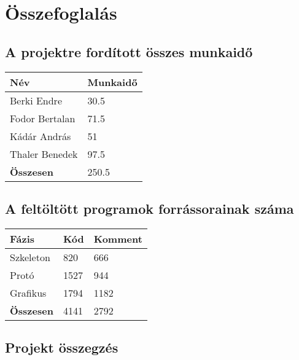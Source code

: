 

\usepackage{enumitem}
\usepackage{textcomp}
\usepackage[utf8]{inputenc}
\usepackage[T1]{fontenc}



\fedlap

\addtocounter{section}{13}
\section{Összefoglalás}

	\subsection{A projektre fordított összes munkaidő}
		\begin{center}
		    \begin{tabular}{ | l | l |}
			    \hline
			    \textbf{Név}		& \textbf{Munkaidő}	\\ \hline
				Berki Endre			& 30.5				\\ \hline
			    Fodor Bertalan		& 71.5				\\ \hline
			    Kádár András		& 51				\\ \hline
			    Thaler Benedek		& 97.5				\\ \hline
			    \hline
			    \textbf{Összesen}	& 250.5				\\ \hline
		    \end{tabular}
		\end{center}
	
	\subsection{A feltöltött programok forrássorainak száma}
		\begin{center}
		    \begin{tabular}{ | l | l | l |}
			    \hline
			    \textbf{Fázis}		& \textbf{Kód}	& \textbf{Komment}	\\ \hline
				Szkeleton			& 820			& 666				\\ \hline
			    Protó				& 1527			& 944				\\ \hline
			    Grafikus			& 1794			& 1182				\\ \hline
			    \hline
			    \textbf{Összesen}	& 4141			& 2792				\\ \hline
		    \end{tabular}
		\end{center}
	
	\subsection{Projekt összegzés}
		
